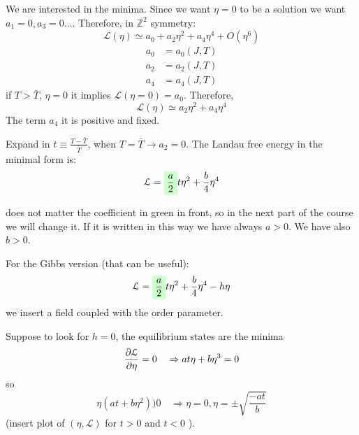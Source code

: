 \documentclass[../main/main.tex]{subfiles}
\begin{document}
We are interested in the minima.
Since we want \( \eta = 0 \) to be a solution we want \( a_1 = 0,a_3= 0 \dots \).
Therefore, in \( \mathbb{Z}^2 \) symmetry:
\begin{equation}
  \mathcal{L} (\eta ) \simeq a_0 + a_2 \eta  ^2 + a_4  \eta  ^4 + O(\eta ^6)
\end{equation}
\begin{subequations}
\begin{align}
  a_0 &= a_0 (J,T) \\
  a_2 &= a_2 (J,T) \\
  a_4 &= a_4 (J,T)
\end{align}
\end{subequations}
if \( T > \bar{T}  \), \( \eta =0 \) it implies \( \mathcal{L} (\eta = 0) = a_0 \). Therefore,
\begin{equation}
    \mathcal{L} (\eta ) \simeq  a_2 \eta  ^2 + a_4  \eta  ^4
\end{equation}
The term \( a_4 \) it is positive and fixed.

Expand in \( t \equiv \frac{T - \bar{T} }{\bar{T} } \), when \( T = \bar{T} \rightarrow a_2 = 0 \).
The Landau free energy in the minimal form is:
\begin{equation}
  \mathcal{L} =  \mathcolorbox{green!20}{\frac{a}{2}} t \eta ^2 + \frac{b}{4} \eta ^4
\end{equation}
\begin{remark}
does not matter the coefficient in green in front, so in the next part of the course we will change it. If it is written in this way we have always \( a>0 \). We have also \( b>0 \).
\end{remark}
For the Gibbs version (that can be useful):
\begin{equation}
  \mathcal{L} =  \mathcolorbox{green!20}{\frac{a}{2}} t \eta ^2 + \frac{b}{4} \eta ^4 - h \eta
\end{equation}
we insert a field coupled with the order parameter.

Suppose to look for \( h=0 \), the equilibrium states are the minima
\begin{equation}
  \pdv{\mathcal{L}}{\eta } = 0 \quad \Rightarrow  a t \eta + b \eta ^3 = 0
\end{equation}
so
\begin{equation}
  \eta (at+b \eta ^2) ) 0 \quad \Rightarrow \eta =0, \eta = \pm \sqrt{\frac{-at}{b}}
\end{equation}
(insert plot of \( (\eta,\mathcal{L}) \) for \( t>0 \)  and \( t<0 \) ).
\end{document}

